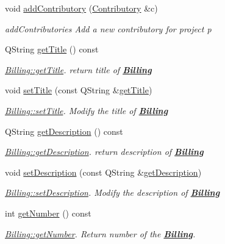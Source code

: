\begin{DoxyCompactItemize}
\item 
void \hyperlink{classBilling_ad5605f69c9b8ba633e904532cb7335f8}{add\+Contributory} (\hyperlink{classContributory}{Contributory} \&c)
\begin{DoxyCompactList}\small\item\em add\+Contributories Add a new contributory for project p \end{DoxyCompactList}\item 
Q\+String \hyperlink{classBilling_ad817d4a1dfa011d20b4358a896662f0e}{get\+Title} () const 
\begin{DoxyCompactList}\small\item\em \hyperlink{classBilling_ad817d4a1dfa011d20b4358a896662f0e}{Billing\+::get\+Title}. return title of {\bfseries \hyperlink{classBilling}{Billing}} \end{DoxyCompactList}\item 
void \hyperlink{classBilling_a3e5e98325bd0e9fb4c253ddf07bf66c8}{set\+Title} (const Q\+String \&\hyperlink{classBilling_ad817d4a1dfa011d20b4358a896662f0e}{get\+Title})
\begin{DoxyCompactList}\small\item\em \hyperlink{classBilling_a3e5e98325bd0e9fb4c253ddf07bf66c8}{Billing\+::set\+Title}. Modify the title of {\bfseries \hyperlink{classBilling}{Billing}} \end{DoxyCompactList}\item 
Q\+String \hyperlink{classBilling_a80bc37920ce2ea1664514f4ade917083}{get\+Description} () const 
\begin{DoxyCompactList}\small\item\em \hyperlink{classBilling_a80bc37920ce2ea1664514f4ade917083}{Billing\+::get\+Description}. return description of {\bfseries \hyperlink{classBilling}{Billing}} \end{DoxyCompactList}\item 
void \hyperlink{classBilling_aa1c99e5e1831053172cea90699cb50cc}{set\+Description} (const Q\+String \&\hyperlink{classBilling_a80bc37920ce2ea1664514f4ade917083}{get\+Description})
\begin{DoxyCompactList}\small\item\em \hyperlink{classBilling_aa1c99e5e1831053172cea90699cb50cc}{Billing\+::set\+Description}. Modify the description of {\bfseries \hyperlink{classBilling}{Billing}} \end{DoxyCompactList}\item 
int \hyperlink{classBilling_a23a9446aef6af58bcfa698b76cc24731}{get\+Number} () const 
\begin{DoxyCompactList}\small\item\em \hyperlink{classBilling_a23a9446aef6af58bcfa698b76cc24731}{Billing\+::get\+Number}. Return number of the {\bfseries \hyperlink{classBilling}{Billing}}. \end{DoxyCompactList}\item 

\end{DoxyCompactItemize}
